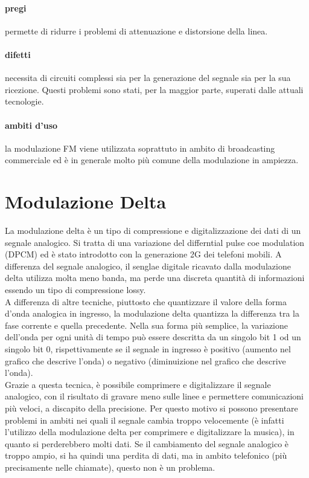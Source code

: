 \documentclass{article}
\begin{document}
\paragraph{pregi} permette di ridurre i problemi di attenuazione e distorsione
della linea.

\paragraph{difetti} necessita di circuiti complessi sia per la generazione del
segnale sia per la sua ricezione. Questi problemi sono stati, per la maggior
parte, superati dalle attuali tecnologie. 

\paragraph{ambiti d'uso} la modulazione FM viene utilizzata soprattuto in ambito
di broadcasting commerciale ed è in generale molto più comune della modulazione
in ampiezza. 

\section{Modulazione Delta}

La modulazione delta è un tipo di compressione e digitalizzazione dei dati di un
segnale analogico. Si tratta di una variazione del differntial pulse coe
modulation (DPCM) ed è stato introdotto con la generazione 2G dei telefoni
mobili. A differenza del segnale analogico, il senglae digitale ricavato dalla
modulazione delta utilizza molta meno banda, ma perde una discreta quantità di
informazioni essendo un tipo di compressione lossy.\\
A differenza di altre tecniche, piuttosto che quantizzare il valore della forma
d'onda analogica in ingresso, la modulazione delta quantizza la differenza tra
la fase corrente e quella precedente. Nella sua forma più semplice, la
variazione dell'onda per ogni unità di tempo può essere descritta da un singolo
bit 1 od un singolo bit 0, rispettivamente se il segnale in ingresso è positivo
(aumento nel grafico che descrive l'onda) o negativo (diminuizione nel grafico
che descrive l'onda).\\
Grazie a questa tecnica, è possibile comprimere e digitalizzare il segnale
analogico, con il risultato di gravare meno sulle linee e permettere
comunicazioni più veloci, a discapito della precisione. Per questo motivo si
possono presentare problemi in ambiti nei quali il segnale cambia troppo
velocemente (è infatti l'utilizzo della modulazione delta per comprimere e
digitalizzare la musica), in quanto si perderebbero molti dati. Se il
cambiamento del segnale analogico è troppo ampio, si ha quindi una perdita di
dati, ma in ambito telefonico (più precisamente nelle chiamate), questo non è un
problema.
\end{document}
